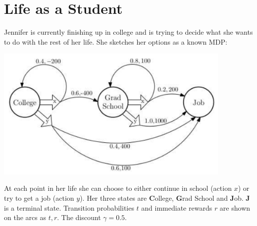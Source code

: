 \documentclass[12pt]{article}
\begin{document}
\clearpage

\section{Life as a Student}

Jennifer is currently finishing up in college and is trying to decide
what she wants to do with the rest of her life.  She sketches her
options as a known MDP:

\begin{center}
\includegraphics[width=4.5in]{student_life.png}
\end{center}

At each point in her life she can choose to either continue in school
(action $x$) or try to get a job (action $y$).  Her three states are
{\bf C}ollege, {\bf G}rad School and {\bf J}ob.  {\bf J} is a terminal
state.  Transition probabilities $t$ and immediate rewards $r$ are
shown on the arcs as $t,r$.  The discount $\gamma = 0.5$.
\end{document}
